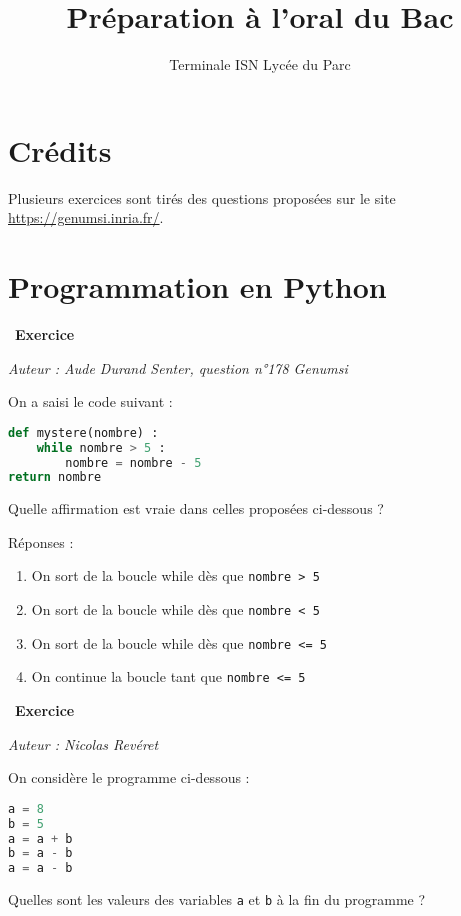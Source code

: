 \documentclass[
  11pt,
]{article}
\title{Préparation à l'oral du Bac}
\author{Terminale ISN Lycée du Parc}
\date{}
\newcommand{\passthrough}[1]{#1}
\providecommand{\tightlist}{%
  \setlength{\itemsep}{0pt}\setlength{\parskip}{0pt}}
\newcounter{exo}
\newenvironment{exercice}[1]
{\par \medskip   \addtocounter{exo}{1} \noindent  
\begin{bclogo}[arrondi =0.1,   noborder = true, logo=\bccrayon, marge=4]{~\textbf{Exercice} \textbf{\theexo} {\itshape #1} }  \par}
{
\end{bclogo}
 \par \bigskip }
\newcounter{prop}
\newcounter{def}
\newcounter{prog}
\begin{document}
\maketitle

\renewcommand*\contentsname{Table des matières}
{
\hypersetup{linkcolor=}
\setcounter{tocdepth}{3}
\tableofcontents
}
\hypertarget{cruxe9dits}{%
\section{Crédits}\label{cruxe9dits}}

Plusieurs exercices sont tirés des questions proposées sur le site
\url{https://genumsi.inria.fr/}.

\hypertarget{programmation-en-python}{%
\section{Programmation en Python}\label{programmation-en-python}}

\begin{exercice}{}

\emph{Auteur : Aude Durand Senter, question n°178 Genumsi}

On a saisi le code suivant :

\begin{lstlisting}[language=Python]
def mystere(nombre) :
    while nombre > 5 :
        nombre = nombre - 5
return nombre
\end{lstlisting}

Quelle affirmation est vraie dans celles proposées ci-dessous ?

Réponses :

\begin{enumerate}
\def\labelenumi{\arabic{enumi}.}
\tightlist
\item
  On sort de la boucle while dès que
  \passthrough{\lstinline!nombre > 5!}
\item
  On sort de la boucle while dès que
  \passthrough{\lstinline!nombre < 5!}
\item
  On sort de la boucle while dès que
  \passthrough{\lstinline!nombre <= 5!}
\item
  On continue la boucle tant que \passthrough{\lstinline!nombre <= 5!}
\end{enumerate}

\end{exercice}

\begin{exercice}{}

\emph{Auteur : Nicolas Revéret}

On considère le programme ci-dessous :

\begin{lstlisting}[language=Python]
a = 8
b = 5
a = a + b
b = a - b
a = a - b
\end{lstlisting}

Quelles sont les valeurs des variables \passthrough{\lstinline!a!} et
\passthrough{\lstinline!b!} à la fin du programme ?

\end{exercice}
\end{document}
